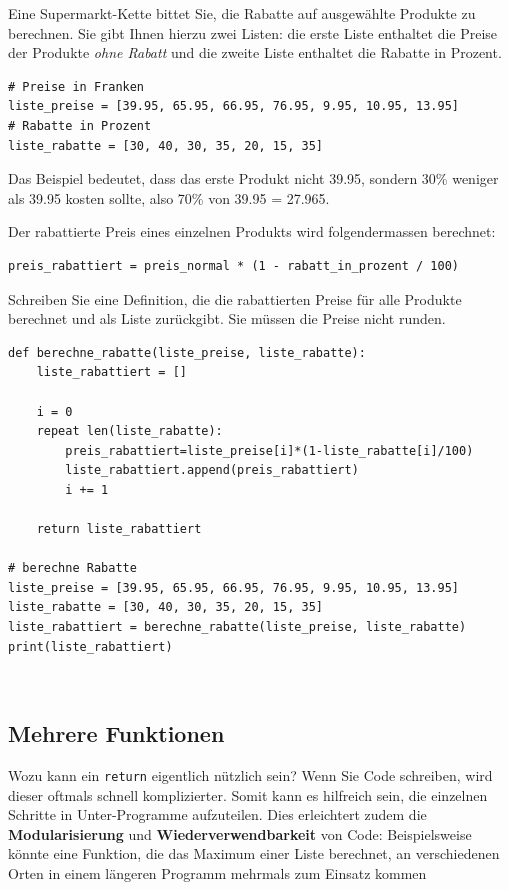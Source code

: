 \begin{myexercise}
Eine Supermarkt-Kette bittet Sie, die Rabatte auf ausgewählte Produkte zu berechnen. Sie gibt Ihnen hierzu zwei Listen: die erste Liste enthaltet die Preise der Produkte \textit{ohne Rabatt} und die zweite Liste enthaltet die Rabatte in Prozent.

\begin{lstlisting}
# Preise in Franken
liste_preise = [39.95, 65.95, 66.95, 76.95, 9.95, 10.95, 13.95] 
# Rabatte in Prozent
liste_rabatte = [30, 40, 30, 35, 20, 15, 35] 
\end{lstlisting}

Das Beispiel bedeutet, dass das erste Produkt nicht 39.95, sondern 30\% weniger als 39.95 kosten sollte, also 70\% von 39.95 = 27.965.

Der rabattierte Preis eines einzelnen Produkts wird folgendermassen berechnet:
\begin{lstlisting}
preis_rabattiert = preis_normal * (1 - rabatt_in_prozent / 100)
\end{lstlisting}
Schreiben Sie eine Definition, die die rabattierten Preise für alle Produkte berechnet und als Liste zurückgibt. Sie müssen die Preise nicht runden. 

\begin{myanswer}
\begin{lstlisting}
def berechne_rabatte(liste_preise, liste_rabatte):
    liste_rabattiert = []
    
    i = 0
    repeat len(liste_rabatte):
        preis_rabattiert=liste_preise[i]*(1-liste_rabatte[i]/100)
        liste_rabattiert.append(preis_rabattiert)
        i += 1
        
    return liste_rabattiert

# berechne Rabatte
liste_preise = [39.95, 65.95, 66.95, 76.95, 9.95, 10.95, 13.95]
liste_rabatte = [30, 40, 30, 35, 20, 15, 35]
liste_rabattiert = berechne_rabatte(liste_preise, liste_rabatte)
print(liste_rabattiert)
\end{lstlisting}
\end{myanswer}
 
\end{myexercise}
\subsection{Mehrere Funktionen}
Wozu kann ein \lstinline|return| eigentlich nützlich sein? Wenn Sie Code schreiben, wird dieser oftmals schnell komplizierter. Somit kann es hilfreich sein, die einzelnen Schritte in Unter-Programme aufzuteilen. Dies erleichtert zudem die \textbf{Modularisierung} und \textbf{Wiederverwendbarkeit} von Code: Beispielsweise könnte eine Funktion, die das Maximum einer Liste berechnet, an verschiedenen Orten in einem längeren Programm mehrmals zum Einsatz kommen

